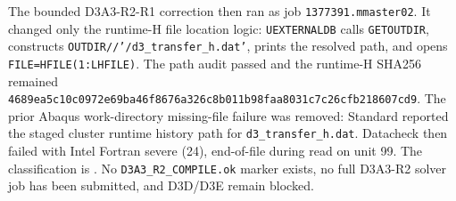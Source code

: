 The bounded D3A3-R2-R1 correction then ran as job
\texttt{1377391.mmaster02}. It changed only the runtime-H file location logic:
\texttt{UEXTERNALDB} calls \texttt{GETOUTDIR}, constructs
\texttt{OUTDIR//'/d3\_transfer\_h.dat'}, prints the resolved
path, and opens \texttt{FILE=HFILE(1:LHFILE)}. The path audit passed and the
runtime-H SHA256 remained
\texttt{4689ea5c10c0972e69ba46f8676a326c8b011b98faa8031c7c26cfb218607cd9}.
The prior Abaqus work-directory missing-file failure was removed: Standard
reported the staged cluster runtime history path for
\texttt{d3\_transfer\_h.dat}. Datacheck then failed with Intel Fortran severe
(24), end-of-file during read on unit 99. The classification is
. No
\texttt{D3A3\_R2\_COMPILE.ok} marker exists, no full D3A3-R2 solver job has
been submitted, and D3D/D3E remain blocked.

